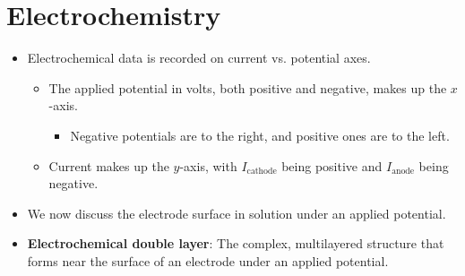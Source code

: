 \documentclass[../notes.tex]{subfiles}
\begin{document}
\section{Electrochemistry}
\begin{itemize}
    \item {}Electrochemical data is recorded on current vs. potential axes.
    \begin{itemize}
        \item The applied potential in volts, both positive and negative, makes up the $x$-axis.
        \begin{itemize}
            \item Negative potentials are to the right, and positive ones are to the left.
        \end{itemize}
        \item Current makes up the $y$-axis, with $I_\text{cathode}$ being positive and $I_\text{anode}$ being negative.
    \end{itemize}
    \item We now discuss the electrode surface in solution under an applied potential.
    \item \textbf{Electrochemical double layer}: The complex, multilayered structure that forms near the surface of an electrode under an applied potential.
    \begin{figure}[h!]
        \centering
\end{figure}
\end{itemize}
\end{document}
